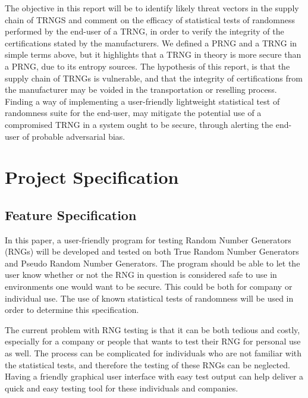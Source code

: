 \documentclass[]{final_report}
\begin{document}
\par{The objective in this report will be to identify likely threat vectors in the supply chain of TRNGS and comment on the efficacy of statistical tests of randomness performed by the end-user of a TRNG, in order to verify the integrity of the certifications stated by the manufacturers. We defined a PRNG and a TRNG in simple terms above, but it highlights that a TRNG in theory is more secure than a PRNG, due to its entropy sources. The hypothesis of this report, is that the supply chain of TRNGs is vulnerable, and that the integrity of certifications from the manufacturer may be voided in the transportation or reselling process. Finding a way of implementing a user-friendly lightweight statistical test of randomness suite for the end-user, may mitigate the potential use of a compromised TRNG in a system ought to be secure, through alerting the end-user of probable adversarial bias.}


\chapter*{Project Specification}
\section*{Feature Specification}

\par{In this paper, a user-friendly program for testing Random Number Generators (RNGs) will be developed and tested on both True Random Number Generators and Pseudo Random Number Generators. The program should be able to let the user know whether or not the RNG in question is considered safe to use in environments one would want to be secure. This could be both for company or individual use. The use of known statistical tests of randomness will be used in order to determine this specification.}

\par{The current problem with RNG testing is that it can be both tedious and costly, especially for a company or people that wants to test their RNG for personal use as well. The process can be complicated for individuals who are not familiar with the statistical tests, and therefore the testing of these RNGs can be neglected. Having a friendly graphical user interface with easy test output can help deliver a quick and easy testing tool for these individuals and companies.}
\end{document}
